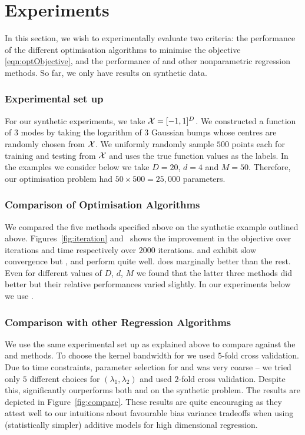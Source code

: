 
\section{Experiments}
\label{sec:experiments}

In this section, we wish to experimentally evaluate two criteria: the
performance of the different optimisation algorithms to minimise the \addkrrs
objective \eqref{eqn:optObjective}, and the performance of \addkrrs and other
nonparametric regression methods. So far, we only have results on synthetic
data.

\subsubsection*{Experimental set up}
For our synthetic experiments, we take $\mathcal{X} = [-1, 1]^D$.
We constructed a function of $3$ modes by taking the logarithm of $3$
Gaussian bumps whose centres are randomly chosen from $\mathcal{X}$.
We uniformly randomly sample $500$ points each for training and testing from
$\mathcal{X}$ and uses the true function values as the labels.
In the examples we consider below we take $D = 20$, $d = 4$ and $M = 50$. 
Therefore, our optimisation problem had $50 \times 500 = 25,000$ parameters.


\subsubsection*{Comparison of Optimisation Algorithms}
We compared the five methods specified above on the synthetic example outlined
above. Figures~\ref{fig:iteration} and~ shows the improvement
in the objective over iterations and time respectively over $2000$ iterations. 
\subgrad and \proxgrad exhibit slow convergence but
\proxgradaccn, \bcdexact and \bcgddiag perform quite well. 
\proxgradaccn does marginally better than the rest.
Even for different values of $D$, $d$, $M$  we found that the latter three
methods did better but their relative performances varied slightly.
In our experiments below we use \proxgradaccn.

\subsubsection*{Comparison with other Regression Algorithms}
We use the same experimental set up as explained above to compare \addkrrs
against the \krrs and \nws methods. To choose the kernel bandwidth for \nws  
we used $5$-fold cross validation. Due to time constraints, parameter selection 
 for \addkrrs and \krrs was very coarse -- we tried only $5$ different choices
for $(\lambda_1, \lambda_2)$ and used $2$-fold cross validation.
Despite this, \addkrrs significantly ourperforms both \krrs and \nws on the
synthetic problem. The results are depicted in Figure~\ref{fig:compare}. These
results are quite encouraging as they attest well to our intuitions about
favourable bias variance tradeoffs when using (statistically simpler) additive
models for high dimensional regression.

